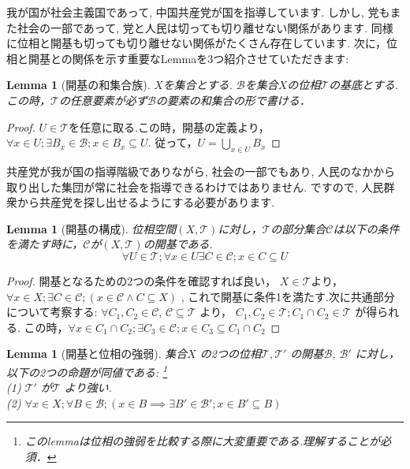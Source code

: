 \documentclass[dvipdfmx]{jbook}
\newtheorem{lemma}[theorem]{Lemma}
\theoremstyle{remark}
\theoremstyle{plain}
\begin{document}
我が国が社会主義国であって, 中国共産党が国を指導しています. しかし, 党もまた社会の一部であって, 党と人民は切っても切り離せない関係があります. 同様に位相と開基も切っても切り離せない関係がたくさん存在しています.
次に，位相と開基との関係を示す重要なLemmaを3つ紹介させていただきます:

\begin{lemma}[開基の和集合族]
	$X$を集合とする. $\mathcal{B}$を集合$X$の位相$\mathcal{T}$の基底とする.この時，$\mathcal{T}$の任意要素が必ず$\mathcal{B}$の要素の和集合の形で書ける．
\end{lemma}

\begin{proof}
	$U\in \mathcal{T}$を任意に取る.この時，開基の定義より，$\forall x \in U ; \exists B_x \in \mathcal{B}; x \in B_x \subseteq U.$ 従って，$U=\bigcup_{x \in U}B_x$
\end{proof}




共産党が我が国の指導階級でありながら, 社会の一部でもあり, 人民のなかから取り出した集団が常に社会を指導できるわけではありません. ですので, 人民群衆から共産党を探し出せるようにする必要があります.

\begin{lemma}[開基の構成]\label{lem:1od}
	位相空間$(X,\mathcal{T})$に対し，$\mathcal{T}$の部分集合$\mathcal{C}$は以下の条件を満たす時に，$\mathcal{C}$が$(X,\mathcal{T})$の開基である.
	$$\forall U \in \mathcal{T};\forall x \in U \exists C \in \mathcal{C}; x \in C \subseteq U$$
\end{lemma}

\begin{proof}
	開基となるための2つの条件を確認すれば良い，
	$X \in \mathcal{T}$より，
	$\forall x \in X; \exists C \in \mathcal{C}; \left( x \in \mathcal{C} \land C \subseteq X  \right)  $ ,
	これで開基に条件1を満たす.次に共通部分について考察する: 
	$\forall C_1 , C_2  \in \mathcal{C} $,
	$ \mathcal{C} \subseteq \mathcal{T}$ より，
	$C_1 , C_2 \in \mathcal{T}; C_1 \cap C_2 \in \mathcal{T}$ が得られる.
	この時，$\forall x \in C_1 \cap C_2; \exists C_3 \in \mathcal{C} ; x \in C_3 \subseteq C_1 \cap C_2$
\end{proof}






\begin{lemma}[開基と位相の強弱]
	集合$X$ の2つの位相$\mathcal{T} , \mathcal{T'}$ の開基$ \mathcal{B}$, $ \mathcal{B'}$ に対し，
	以下の2つの命題が同値である: \footnote{このlemmaは位相の強弱を比較する際に大変重要である.理解することが必須．}\\
	(1) $\mathcal{T'}$ が$\mathcal{T}$ より強い.\\
	(2) $\forall x \in X; \forall B \in \mathcal{B} ; \left( x \in B \implies  \exists B' \in  \mathcal{B'} ; x \in B' \subseteq B \right) $
\end{lemma}
\end{document}
